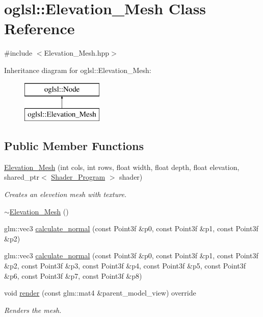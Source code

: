 \hypertarget{classoglsl_1_1_elevation___mesh}{}\section{oglsl\+:\+:Elevation\+\_\+\+Mesh Class Reference}
\label{classoglsl_1_1_elevation___mesh}


{\ttfamily \#include $<$Elevation\+\_\+\+Mesh.\+hpp$>$}

Inheritance diagram for oglsl\+:\+:Elevation\+\_\+\+Mesh\+:\begin{figure}[H]
\begin{center}
\leavevmode
\includegraphics[height=2.000000cm]{classoglsl_1_1_elevation___mesh}
\end{center}
\end{figure}
\subsection*{Public Member Functions}
\begin{DoxyCompactItemize}
\item 
\mbox{\hyperlink{classoglsl_1_1_elevation___mesh_ab23733c3bcec54943bb012c272a44ca3}{Elevation\+\_\+\+Mesh}} (int cols, int rows, float width, float depth, float elevation, shared\+\_\+ptr$<$ \mbox{\hyperlink{classoglsl_1_1_shader___program}{Shader\+\_\+\+Program}} $>$ shader)
\begin{DoxyCompactList}\small\item\em Creates an elevetion mesh with texture. \end{DoxyCompactList}\item 
\mbox{\hyperlink{classoglsl_1_1_elevation___mesh_afc3f5227d96a854e9e66723fbf728cb2}{$\sim$\+Elevation\+\_\+\+Mesh}} ()
\item 
glm\+::vec3 \mbox{\hyperlink{classoglsl_1_1_elevation___mesh_ad141ee161715d896f41ca7b31b9d0c7d}{calculate\+\_\+normal}} (const Point3f \&p0, const Point3f \&p1, const Point3f \&p2)
\item 
glm\+::vec3 \mbox{\hyperlink{classoglsl_1_1_elevation___mesh_a768320a6bdacdeff34528c0c08f92b5c}{calculate\+\_\+normal}} (const Point3f \&p0, const Point3f \&p1, const Point3f \&p2, const Point3f \&p3, const Point3f \&p4, const Point3f \&p5, const Point3f \&p6, const Point3f \&p7, const Point3f \&p8)
\item 
void \mbox{\hyperlink{classoglsl_1_1_elevation___mesh_afb39dc1633680dccabb4b8da72ac4733}{render}} (const glm\+::mat4 \&parent\+\_\+model\+\_\+view) override
\begin{DoxyCompactList}\small\item\em Renders the mesh. \end{DoxyCompactList}\end{DoxyCompactItemize}
